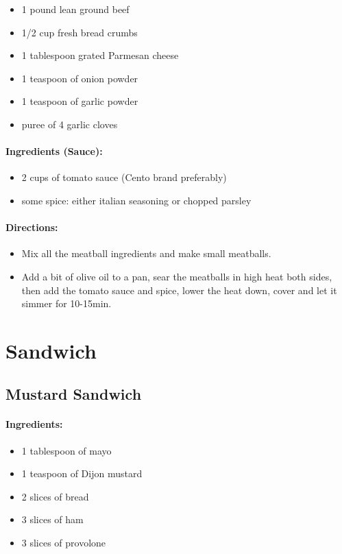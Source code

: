 \documentclass{article}
\begin{document}
\begin{itemize}
	\item 1 pound lean ground beef 
	\item 1/2 cup fresh bread crumbs 
	\item 1 tablespoon grated Parmesan cheese 
	\item 1 teaspoon of onion powder
	\item 1 teaspoon of garlic powder
	\item puree of 4 garlic cloves 
\end{itemize}

\paragraph{Ingredients (Sauce):}
\begin{itemize}
	\item 2 cups of tomato sauce (Cento brand preferably)
	\item some spice: either italian seasoning or chopped parsley
\end{itemize}

\paragraph{Directions:}
\begin{itemize}
	\item Mix all the meatball ingredients and make small meatballs.
	\item Add a bit of olive oil to a pan, sear the meatballs in high heat both sides, then add the tomato sauce and spice, lower the heat down, cover and let it simmer for 10-15min.
\end{itemize}

\section{Sandwich}

\subsection{Mustard Sandwich}

\paragraph{Ingredients:}

\begin{itemize}
	\item 1 tablespoon of mayo 
	\item 1 teaspoon of Dijon mustard 
	\item 2 slices of bread 
	\item 3 slices of ham 
	\item 3 slices of provolone
\end{itemize}
\end{document}
